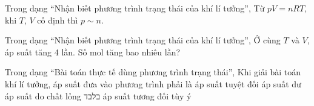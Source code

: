 \begin{ex}
Trong dạng “Nhận biết phương trình trạng thái của khí lí tưởng”, Từ $pV=nRT$, khi $T$, $V$ cố định thì $p\sim n$.
\choiceTF

\end{ex}

\begin{ex}
Trong dạng “Nhận biết phương trình trạng thái của khí lí tưởng”, Ở cùng $T$ và $V$, áp suất tăng 4 lần. Số mol tăng bao nhiêu lần?
\end{ex}

\begin{ex}
Trong dạng “Bài toán thực tế dùng phương trình trạng thái”, Khi giải bài toán khí lí tưởng, áp suất đưa vào phương trình phải là
\choice
{\True áp suất tuyệt đối}
{áp suất dư}
{áp suất do chất lỏng בלבד}
{áp suất tương đối tùy ý}
\end{ex}

